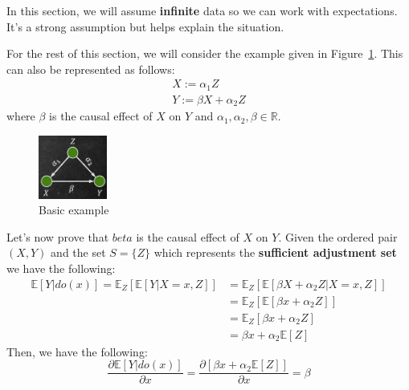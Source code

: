\begin{note}
    In this section, we will assume \textbf{infinite} data so we can work with
    expectations. It's a strong assumption but helps explain the situation.
\end{note}

For the rest of this section, we will consider the example given in Figure~\ref{fig:example}.
This can also be represented as follows:
\begin{equation}
    \begin{array}{l}
        X := \alpha_1 Z \\ Y := \beta X + \alpha_2 Z
    \end{array}
\end{equation}
where $\beta$ is the causal effect of $X$ on $Y$ and $\alpha_1, \alpha_2, \beta \in \mathbb{R}$.
\begin{figure}[!ht]
    \centering
    \includegraphics[width=0.2\textwidth]{img/structural_causal_model/example.png}
    \caption{Basic example}
    \label{fig:example}
\end{figure}

Let's now prove that $ beta$ is the causal effect of $X$ on $Y$. Given the ordered
pair $(X, Y)$ and the set $S = \{Z\}$ which represents the \textbf{sufficient
    adjustment set} we have the following:
\begin{equation}
    \begin{array}{ll}
        \mathbb{E}[Y | do(x)] = \mathbb{E}_Z[\mathbb{E}[Y | X = x, Z]] & = \mathbb{E}_Z[\mathbb{E}[\beta X + \alpha_2 Z | X = x, Z]] \\
                                                                       & = \mathbb{E}_Z[\mathbb{E}[\beta x + \alpha_2 Z]]            \\
                                                                       & = \mathbb{E}_Z[\beta x + \alpha_2 Z]                        \\
                                                                       & = \beta x + \alpha_2\mathbb{E}[Z]
    \end{array}
\end{equation}
Then, we have the following:
\begin{equation}
    \frac{\partial \mathbb{E}[Y |do(x)]}{\partial x} = \frac{\partial [\beta x + \alpha_2\mathbb{E}[Z]]}{\partial x} = \beta
\end{equation}

